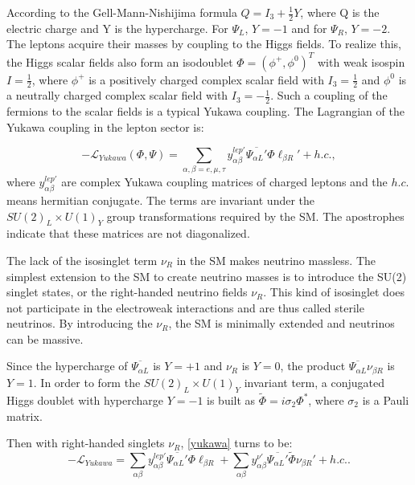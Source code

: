 According to the Gell-Mann-Nishijima formula $Q=I_3+\frac{1}{2}Y$, where Q is the electric charge and Y is the hypercharge. For $\Psi_L$, $Y=-1$ and for $\Psi_R$, $Y=-2$. The leptons acquire their masses by coupling to the Higgs fields. To realize this, the Higgs scalar fields also form an isodoublet $\Phi = (\phi^+,\phi^0)^T$ with weak isospin $I=\frac{1}{2}$, where $\phi^+$ is a positively charged complex scalar field with $I_3=\frac{1}{2}$ and $\phi^0$ is a neutrally charged complex scalar field with $I_3=-\frac{1}{2}$. Such a coupling of the fermions to the scalar fields is a typical Yukawa coupling. The Lagrangian of the Yukawa coupling in the lepton sector is\cite{funchal2013physics}:

\begin{equation}\label{yukawa}
-\mathcal L_{Yukawa}(\Phi,\Psi) =\sum_{\alpha,\beta=e,\mu,\tau} y^{lep'}_{\alpha\beta} \overline{\Psi_{\alpha L}'}\Phi\ell_{\beta R}' + h.c.,
\end{equation}
where $y^{lep'}_{\alpha\beta}$ are complex Yukawa coupling matrices of charged leptons and the $h.c.$ means hermitian conjugate. The terms are invariant under the $SU(2)_L\times U(1)_Y$ group transformations required by the SM. The apostrophes indicate that these matrices are not diagonalized.

The lack of the isosinglet term $\nu_R$ in the SM makes neutrino massless. The simplest extension to the SM to create neutrino masses is to introduce the SU(2) singlet states, or the right-handed neutrino fields $\nu_R$. This kind of isosinglet does not participate in the electroweak interactions and are thus called sterile neutrinos. By introducing the $\nu_R$, the SM is minimally extended and neutrinos can be massive\cite{giunti2007fundamentals}.

Since the hypercharge of $\overline{\Psi_{\alpha L}}$ is $Y=+1$ and $\nu_R$ is $Y=0$, the product $\overline{\Psi_{\alpha L}}\nu_{\beta R}$ is $Y=1$. In order to form the $SU(2)_L\times U(1)_Y$ invariant term, a conjugated Higgs doublet with hypercharge $Y=-1$ is built as $\widetilde{\Phi}=i\sigma_2\Phi^*$, where $\sigma_2$ is a Pauli matrix\cite{giunti2007fundamentals}.

Then with right-handed singlets $\nu_R$, \ref{yukawa} turns to be\cite{giunti2007fundamentals,funchal2013physics}:
\begin{equation}\label{yukawa2}
-\mathcal{L}_{Yukawa} =  \sum_{\alpha\beta} y^{lep'}_{\alpha\beta} \overline{\Psi_{\alpha L}'}\Phi\ell_{\beta R} + \sum_{\alpha\beta} y^{\nu'}_{\alpha\beta} \overline{\Psi_{\alpha L}'}\widetilde{\Phi}\nu_{\beta R}'+h.c..
\end{equation}

